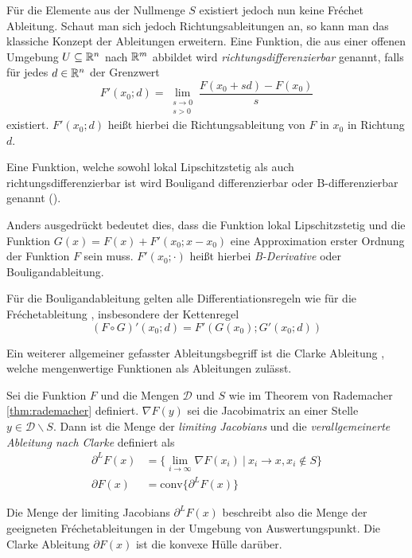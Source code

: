 Für die Elemente aus der Nullmenge $S$ existiert jedoch nun keine Fréchet Ableitung. Schaut man sich jedoch Richtungsableitungen an, so kann man das klassiche Konzept der Ableitungen erweitern. Eine Funktion, die aus einer offenen Umgebung $U\subseteq \mathbb{R}^n$ nach $\mathbb{R}^m$ abbildet wird \textit{richtungsdifferenzierbar} genannt, falls für jedes $d\in \mathbb{R}^n$ der Grenzwert
\begin{equation}\label{eq:bouligandDerivative}
 F'(x_0;d) = \lim_{\substack{s\to 0 \\ s>0}} \frac{F(x_0+sd)-F(x_0)}{s} 
\end{equation}
existiert. $F'(x_0;d)$ heißt hierbei die Richtungsableitung von $F$ in $x_0$ in Richtung $d$.

\begin{definition}[B-Differenzierbarkeit]
Eine Funktion, welche sowohl lokal Lipschitzstetig als auch richtungsdifferenzierbar ist wird Bouligand differenzierbar oder B-differenzierbar genannt (\cite[Def.3.1.2]{scholtes2012introduction}). 
\end{definition}

 Anders ausgedrückt bedeutet dies, dass die Funktion lokal Lipschitzstetig und die Funktion $G(x) = F(x)+F'(x_0;x-x_0)$ eine Approximation erster Ordnung der Funktion $F$ sein muss. $F'(x_0;\cdot)$ heißt hierbei \textit{B-Derivative} oder Bouligandableitung.

Für die Bouligandableitung gelten alle Differentiationsregeln wie für die Fréchetableitung \cite[Cor.3.1.1.]{scholtes2012introduction}, insbesondere der Kettenregel \cite[Thm. 3.1.1.]{scholtes2012introduction}
\begin{equation}
 \label{eq:bouligandChainRule}
 (F\circ G)'(x_0;d) = F'(G(x_0);G'(x_0;d)) 
\end{equation}

Ein weiterer allgemeiner gefasster Ableitungsbegriff ist die Clarke Ableitung \cite[Def. 2.6.1.]{clarke1990optimization}, welche mengenwertige Funktionen als Ableitungen zulässt.
\begin{definition}
 Sei die Funktion $F$ und die Mengen $\mathcal D$ und $S$ wie im Theorem von Rademacher \ref{thm:rademacher} definiert. $\nabla F(y)$ sei die Jacobimatrix an einer Stelle $y\in \mathcal D\backslash S$. Dann ist die Menge der \textit{limiting Jacobians} und die \textit{verallgemeinerte Ableitung nach Clarke} definiert als
 \begin{align}
  \partial^L F(x) &= \lbrace \lim_{i\to \infty} \nabla F(x_i)~ \vert~ x_i \to x, x_i \not \in S \rbrace\\
  \partial F(x) &= \text{conv} \lbrace \partial^L F(x)  \rbrace
 \end{align}
\end{definition}
Die Menge der limiting Jacobians $\partial^L F(x)$ beschreibt also die Menge der geeigneten Fréchetableitungen in der Umgebung von Auswertungspunkt. Die Clarke Ableitung $\partial F(x)$ ist die konvexe Hülle darüber.

